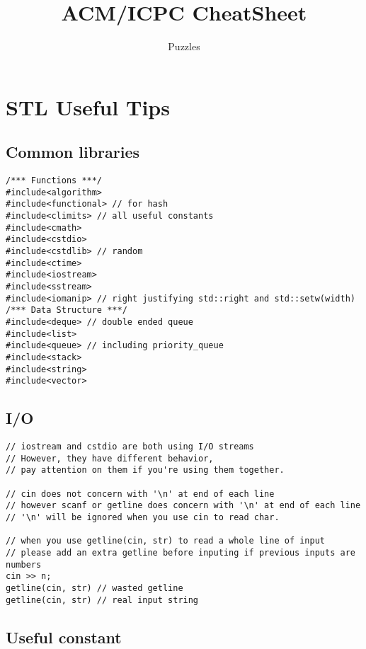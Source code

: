 \documentclass[a4paper]{article}
\title{\textbf{ACM/ICPC CheatSheet}}
\author{Puzzles}
\date{}
\begin{document}
\maketitle
\thispagestyle{empty}
	
{\footnotesize\tableofcontents}

\section{STL Useful Tips}

\subsection{Common libraries}
\begin{verbatim}
/*** Functions ***/
#include<algorithm>
#include<functional> // for hash
#include<climits> // all useful constants
#include<cmath>
#include<cstdio>
#include<cstdlib> // random
#include<ctime>
#include<iostream>
#include<sstream>
#include<iomanip> // right justifying std::right and std::setw(width)
/*** Data Structure ***/
#include<deque> // double ended queue
#include<list>
#include<queue> // including priority_queue
#include<stack>
#include<string>
#include<vector>
\end{verbatim}

\subsection{I/O}

\begin{verbatim}
// iostream and cstdio are both using I/O streams
// However, they have different behavior,
// pay attention on them if you're using them together.

// cin does not concern with '\n' at end of each line
// however scanf or getline does concern with '\n' at end of each line
// '\n' will be ignored when you use cin to read char.

// when you use getline(cin, str) to read a whole line of input
// please add an extra getline before inputing if previous inputs are numbers
cin >> n;
getline(cin, str) // wasted getline
getline(cin, str) // real input string
\end{verbatim}

\subsection{Useful constant}
\end{document}

